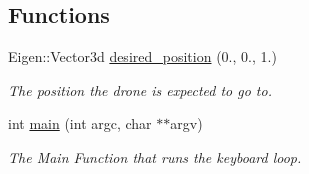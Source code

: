 \subsection*{Functions}
\begin{DoxyCompactItemize}
\item 
Eigen\+::\+Vector3d \hyperlink{oculus-control-keyboard_8cpp_a608d9948c063034b7605598daaeccc3e}{desired\+\_\+position} (0., 0., 1.)
\begin{DoxyCompactList}\small\item\em The position the drone is expected to go to. \end{DoxyCompactList}\item 
int \hyperlink{oculus-control-keyboard_8cpp_a3c04138a5bfe5d72780bb7e82a18e627}{main} (int argc, char $\ast$$\ast$argv)
\begin{DoxyCompactList}\small\item\em The Main Function that runs the keyboard loop. \end{DoxyCompactList}\end{DoxyCompactItemize}
